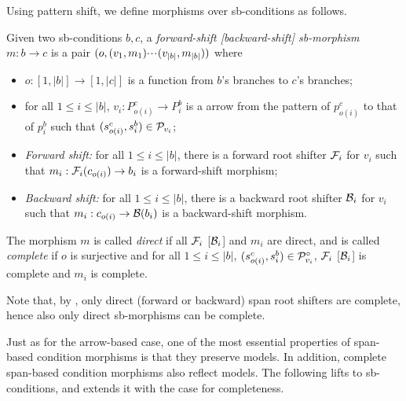 Using pattern shift, we define morphisms over sb-conditions as follows.
%
\begin{definition}
  Given two sb-conditions $b,c$, a \emph{forward-shift [backward-shift] sb-morphism} $m:b\to c$ is a pair $(o,(v_1,m_1){\cdotp\mkern-2mu\cdotp\mkern-2mu\cdotp\mkern1mu} (v_{|b|},m_{|b|}))$ where
  \begin{itemize}[topsep=\smallskipamount]
  \item $o:[1,|b|]\to [1,|c|]$ is a function from $b$'s branches to $c$'s branches;
  \item for all $1\leq i\leq |b|$, $v_i:P^c_{o(i)}\to P^b_i$ is a arrow from the pattern of $p^c_{o(i)}$ to that of $p^b_i$ such that $(s^c_{o(i)},s^b_i)\in \mathcal{P}_{v_i}$;
  \item \emph{Forward shift:} for all $1\leq i\leq |b|$, there is a forward root shifter $\mathcal{F}_i$ for $v_i$ such that $m_i:\mathcal{F}_i(c_{o(i)})\rightarrow b_i$ is a forward-shift morphism;
  \item \emph{Backward shift:} for all $1\leq i\leq |b|$, there is a backward root shifter $\mathcal{B}_i$ for $v_i$ such that $m_i:c_{o(i)}\rightarrow \mathcal{B}(b_i)$ is a backward-shift morphism.
  \end{itemize}
  The morphism $m$ is called \emph{direct} if all $\mathcal{F}_i$ [$\mathcal{B}_i$] and $m_i$ are direct, and is called \emph{complete} if $o$ is surjective and for all $1\leq i\leq |b|$, $(s^c_{o(i)},s^b_i)\in \mathcal{P}^\circ_{v_i}$, $\mathcal{F}_i$ [$\mathcal{B}_i$] is complete and $m_i$ is complete.
\end{definition}
%
Note that, by , only direct (forward or backward) span root shifters are complete, hence also only direct sb-morphisms can be complete.

Just as for the arrow-based case, one of the most essential properties of span-based condition morphisms is that they preserve models. In addition, complete span-based condition morphisms also reflect models. The following lifts  to sb-conditions, and extends it with the case for completeness.

